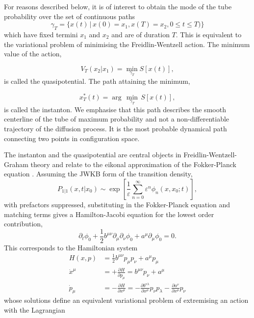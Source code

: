For reasons described below, it is of interest to obtain the mode
of the tube probability over the set of continuous paths
\[
\gamma_{T}=\{x(t)\,|\,x(0)=x_{1},x(T)=x_{2},0\leq t\leq T)\}
\]
which have fixed termini $x_{1}$ and $x_{2}$ and are of duration
$T.$ This is equivalent to the variational problem of minimising
the Freidlin-Wentzell action. The minimum value of the action,

\begin{equation}
V_{T}(x_{2}|x_{1})=\min_{\gamma_{T}}S[x(t)],
\end{equation}
is called the quasipotential. The path attaining the minimum,

\begin{equation}
x_{T}^{*}(t)=\arg\,\min_{\gamma_{T}}\,S[x(t)],
\end{equation}
is called the instanton. We emphasise that this path describes the
smooth centerline of the tube of maximum probability and not a non-differentiable
trajectory of the diffusion process. It is the most probable dynamical
path connecting two points in configuration space. 

The instanton and the quasipotential are central objects in Freidlin-Wentzell-Graham
theory and relate to the eikonal approximation of the Fokker-Planck
equation \citep{ludwig1975persistence}. Assuming the JWKB form of
the transition density,
\[
P_{1|1}(x,t|x_{0})\sim\exp\left[\frac{1}{\varepsilon}\sum_{n=0}^{\infty}\varepsilon^{n}\phi_{n}(x,x_{0};t)\right],
\]
with prefactors suppressed, substituting in the Fokker-Planck equation
and matching terms gives a Hamilton-Jacobi equation for the lowest
order contribution,
\begin{equation}
\partial_{t}\phi_{0}+\frac{1}{2}b^{\mu\nu}\partial_{\mu}\partial_{\nu}\phi_{0}+a^{\mu}\partial_{\mu}\phi_{0}=0.
\end{equation}
This corresponds to the Hamiltonian system
\begin{align}
H(x,p) & =\frac{1}{2}b^{\mu\nu}p_{\mu}p_{\nu}+a^{\mu}p_{\mu}\\
\dot{x}^{\mu} & =+\frac{\partial H}{\partial p_{\mu}}=b^{\mu\nu}p_{\nu}+a^{\mu}\nonumber \\
\dot{p}_{\mu} & =-\frac{\partial H}{\partial x^{\mu}}=-\frac{\partial b^{\nu\lambda}}{\partial x^{\mu}}p_{\nu}p_{\lambda}-\frac{\partial a^{\nu}}{\partial x^{\mu}}p_{\nu}\nonumber 
\end{align}
whose solutions define an equivalent variational problem of extremising
an action with the Lagrangian

